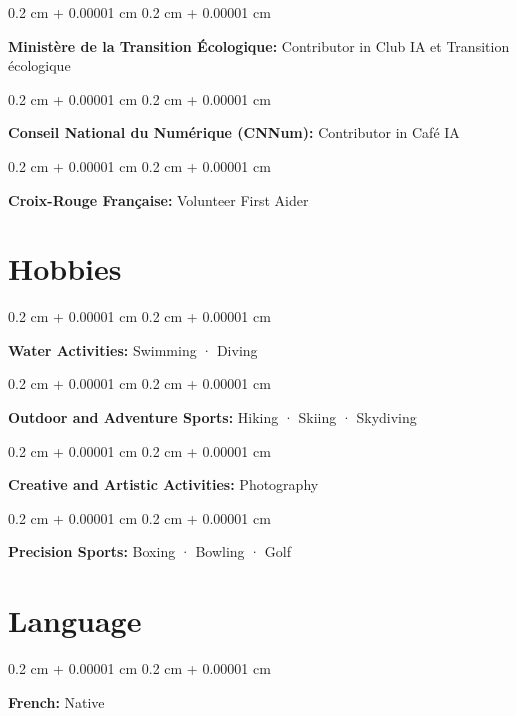 \documentclass[10pt, letterpaper]{article}
\newenvironment{onecolentry}{
    \begin{adjustwidth}{
        0.2 cm + 0.00001 cm
    }{
        0.2 cm + 0.00001 cm
    }
}{
    \end{adjustwidth}
} %
\begin{document}
    \begin{onecolentry}
        \textbf{Ministère de la Transition Écologique:} Contributor in Club IA et Transition écologique
    \end{onecolentry}
    \vspace{0.2 cm}

    \begin{onecolentry}
        \textbf{Conseil National du Numérique (CNNum):} Contributor in Café IA
    \end{onecolentry}
    \vspace{0.2 cm}

    \begin{onecolentry}
        \textbf{Croix-Rouge Française:} Volunteer First Aider
    \end{onecolentry}

    \section{Hobbies}
        \begin{onecolentry}
            \textbf{Water Activities:} Swimming · Diving
        \end{onecolentry}
        \vspace{0.2 cm}

        \begin{onecolentry}
            \textbf{Outdoor and Adventure Sports:} Hiking · Skiing · Skydiving
        \end{onecolentry}
        \vspace{0.2 cm}
        
        \begin{onecolentry}
            \textbf{Creative and Artistic Activities:} Photography
        \end{onecolentry}
        \vspace{0.2 cm}

        \begin{onecolentry}
            \textbf{Precision Sports:} Boxing · Bowling · Golf
        \end{onecolentry}
        \vspace{0.2 cm}


    \section{Language}
        \begin{onecolentry}
            \textbf{French:} Native
        \end{onecolentry}
        \vspace{0.2 cm}
\end{document}
